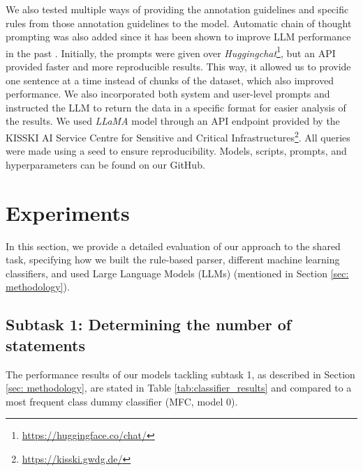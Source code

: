 \documentclass[11pt]{article}
\begin{document}
We also tested multiple ways of providing the annotation guidelines and specific rules from those annotation guidelines to the model. Automatic chain of thought prompting was also added since it has been shown to improve LLM performance in the past \cite{NEURIPS2022_9d560961, zhang_automatic_2022}. Initially, the prompts were given over \textit{Huggingchat}\footnote{\url{https://huggingface.co/chat/}}, but an API provided faster and more reproducible results. This way, it allowed us to provide one sentence at a time instead of chunks of the dataset, which also improved performance. We also incorporated both system and user-level prompts and instructed the LLM to return the data in a specific format for easier analysis of the results. We used \textit{LLaMA} model through an API endpoint provided by the KISSKI AI Service Centre for Sensitive and Critical Infrastructures\footnote{\url{https://kisski.gwdg.de/}}.
All queries were made using a seed to ensure reproducibility. Models, scripts, prompts, and hyperparameters can be found on our GitHub.


\section{Experiments}


In this section, we provide a detailed evaluation of our approach to the shared task, specifying how we built the rule-based parser, different machine learning classifiers, and used Large Language Models (LLMs) (mentioned in Section \ref{sec: methodology}).

\subsection{Subtask 1: Determining the number of statements}\label{subsec: subtask1}

The performance results of our models tackling subtask 1, as described in Section \ref{sec: methodology}, are stated in Table \ref{tab:classifier_results} and compared to a most frequent class dummy classifier (MFC, model 0). 


\end{document}
